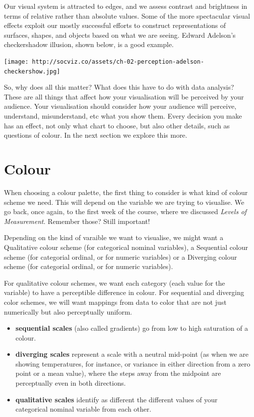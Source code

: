 \documentclass[
]{book}
\providecommand{\tightlist}{%
  \setlength{\itemsep}{0pt}\setlength{\parskip}{0pt}}
\begin{document}
Our visual system is attracted to edges, and we assess contrast and brightness in terms of relative rather than absolute values. Some of the more spectacular visual effects exploit our mostly successful efforts to construct representations of surfaces, shapes, and objects based on what we are seeing. Edward Adelson's checkershadow illusion, shown below, is a good example.

\texttt{[image: http://socviz.co/assets/ch-02-perception-adelson-checkershow.jpg]}

So, why does all this matter? What does this have to do with data analysis? These are all things that affect how your visualisation will be perceived by your audience. Your visualisation should consider how your audience will perceive, understand, misunderstand, etc what you show them. Every decision you make has an effect, not only what chart to choose, but also other details, such as questions of colour. In the next section we explore this more.

\hypertarget{colour}{%
\section{Colour}\label{colour}}

When choosing a colour palette, the first thing to consider is what kind of colour scheme we need. This will depend on the variable we are trying to visualise. We go back, once again, to the first week of the course, where we discussed \emph{Levels of Measurement}. Remember those? Still important!

Depending on the kind of varaible we want to visualise, we might want a Qualitative colour scheme (for categorical nominal variables), a Sequential colour scheme (for categorial ordinal, or for numeric variables) or a Diverging colour scheme (for categorial ordinal, or for numeric variables).

For qualitative colour schemes, we want each category (each value for the variable) to have a perceptible difference in colour. For sequential and diverging color schemes, we will want mappings from data to color that are not just numerically but also perceptually uniform.

\begin{itemize}
\tightlist
\item
  \textbf{sequential scales} (also called gradients) go from low to high saturation of a colour.
\item
  \textbf{diverging scales} represent a scale with a neutral mid-point (as when we are showing temperatures, for instance, or variance in either direction from a zero point or a mean value), where the steps away from the midpoint are perceptually even in both directions.
\item
  \textbf{qualitative scales} identify as different the different values of your categorical nominal variable from each other.
\end{itemize}
\end{document}
